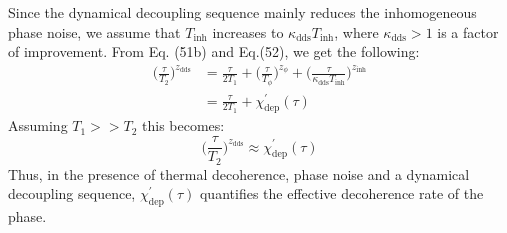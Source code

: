 Since the dynamical decoupling sequence mainly reduces the inhomogeneous phase noise, we assume that $T_{\text{inh}}$ increases to $\kappa_{\text{dds}}T_{\text{inh}}$, where $\kappa_{\text{dds}}>1$ is a factor of improvement. From Eq. (51b) and Eq.(52), we get the following:
\begin{subequations}
    \begin{align}
      \bigg(\frac{\tau}{T_{2}}\bigg)^{z_{\text{dds}}} &= \frac{\tau}{2T_{1}}+\bigg(\frac{\tau}{T_{\phi}}\bigg)^{z_{\phi}} + \bigg(\frac{\tau}{\kappa_{\text{dds}}T_{\text{inh}}}\bigg)^{z_{\text{inh}}}\\
      &= \frac{\tau}{2T_{1}} + \chi^{\prime}_{\text{dep}}(\tau)
    \end{align}
\end{subequations}
Assuming $T_{1}>>T_{2}$ this becomes:
\begin{equation}
     \bigg(\frac{\tau}{T_{2}}\bigg)^{z_{\text{dds}}} \approx \chi^{\prime}_{\text{dep}}(\tau)
\end{equation}
Thus, in the presence of thermal decoherence, phase noise and a dynamical decoupling sequence, $\chi^{\prime}_{\text{dep}}(\tau)$ quantifies the effective decoherence rate of the phase.
